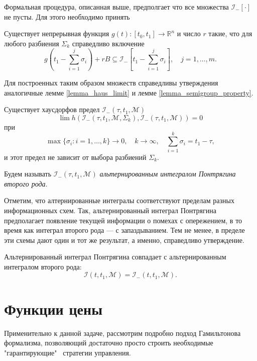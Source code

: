 Формальная процедура, описанная выше, предполгает что все множества \( \mathcal{I}_-[\cdot]\) не пусты.
Для этого необходимо принять
\begin{assumption}
    Существует непрерывная функция \( g(t) : [t_0, t_1] \to \mathbb{R}^n \) и число \( r \) такие,
     что для любого разбиения \( \Sigma_k \) справедливо включение
    \[
        g \left(t_1 - \sum_{i = 1}^j \sigma_i \right) + rB \subseteq \mathcal{I}_-\left[ t_1 - 
         \sum_{i = 1}^j \sigma_i \right], \quad j = 1, \dots, m.
    \]
\end{assumption}

Для построенных таким образом множеств справедливы утверждения аналогичные лемме \eqref{lemma_haus_limit}
 и лемме \eqref{lemma_semigroup_property}.

\begin{lemma}
    Существует хаусдорфов предел \( \mathcal{I}_-(\tau, t_1, \mathcal{M}) \)
    \[
        \lim h \left( \mathcal{I}_-(\tau, t_1, \mathcal{M}, \Sigma_k), \mathcal{I}_-(\tau, t_1,
         \mathcal{M}) \right) = 0    
    \]
    при
    \[
        \max\{\sigma_i : i = 1, \dots, k \} \to 0, \quad k \to \infty, \quad \sum_{i = 1}^k 
         \sigma_i = t_1 - \tau,
    \]
    и этот предел не зависит от выбора разбиений \( \Sigma_k \).
\end{lemma}

Будем называть \( \mathcal{I}_-(\tau, t_1, \mathcal{M}) \) \emph{альтернированным 
 интегралом Понтрягина второго рода}.

Отметим, что алтернированные интегралы соответствуют пределам разных информационных схем. Так,
 альтернированный интеграл Понтрягина предполагает появление текущей информации о помехах с опережением,
 в то время как интеграл второго рода --- с запаздыванием. Тем не менее, в пределе эти схемы дают
 один и тот же результат, а именно, справедливо утверждение.

\begin{theorem}
    Альтернированный интеграл Понтрягина совпадает с альтернированным интегралом второго рода:
    \[
        \mathcal{I}(t, t_1, \mathcal{M}) = \mathcal{I}_-(t, t_1, \mathcal{M}).
    \]
\end{theorem}

\section{Функции цены}
Применительно к данной задаче, рассмотрим подробно подход Гамильтонова формализма, позволяющий
 достаточно просто строить необходимые "гарантирующие" \ стратегии управления. 


